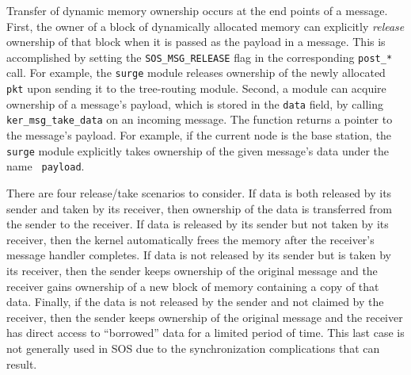 \smallskip{}

Transfer of dynamic memory ownership occurs at the end points of a
message.  First, the owner of a block of dynamically allocated memory
can explicitly {\em release} ownership of that block when it is passed
as the payload in a message.  This is accomplished by setting the
\texttt{SOS\_MSG\_RELEASE} flag in the corresponding {\tt post\_*}
call.  For example, the {\tt surge} module releases ownership of the
newly allocated {\tt pkt} upon sending it to the tree-routing module.
Second, a module can acquire ownership of a message's payload, which
is stored in the {\tt data} field, by calling
\texttt{ker\_msg\_take\_data} on an incoming message.  The function
returns a pointer to the message's payload.  For example, if the
current node is the base station, the {\tt surge} module explicitly
takes ownership of the given message's data under the name {\tt
payload}.

There are four release/take scenarios to consider.  If data is both
released by its sender and taken by its receiver, then ownership of
the data is transferred from the sender to the receiver.  If data is
released by its sender but not taken by its receiver, then the kernel
automatically frees the memory after the receiver's message handler
completes.  If data is not released by its sender but is taken by its
receiver, then the sender keeps ownership of the original message and
the receiver gains ownership of a new block of memory containing a
copy of that data.  Finally, if the data is not released by the sender
and not claimed by the receiver, then the sender keeps ownership of
the original message and the receiver has direct access to
``borrowed'' data for a limited period of time.  This last case is not
generally used in SOS due to the synchronization complications that
can result.


%



